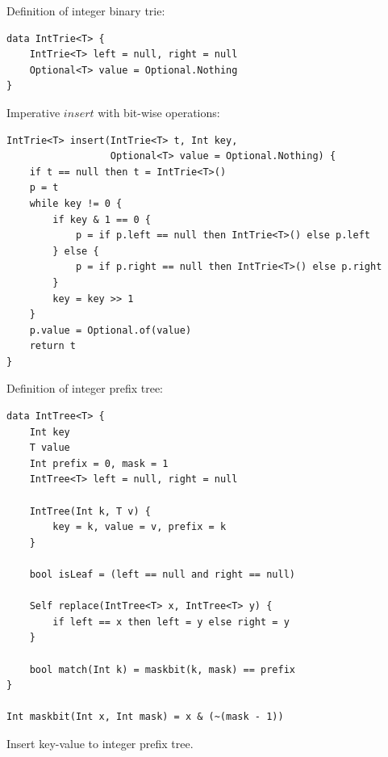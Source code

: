 \documentclass[b5paper]{article}
\begin{document}
Definition of integer binary trie:

\begin{lstlisting}[language = Bourbaki]
data IntTrie<T> {
    IntTrie<T> left = null, right = null
    Optional<T> value = Optional.Nothing
}
\end{lstlisting}

Imperative $insert$ with bit-wise operations:

\begin{lstlisting}[language = Bourbaki]
IntTrie<T> insert(IntTrie<T> t, Int key,
                  Optional<T> value = Optional.Nothing) {
    if t == null then t = IntTrie<T>()
    p = t
    while key != 0 {
        if key & 1 == 0 {
            p = if p.left == null then IntTrie<T>() else p.left
        } else {
            p = if p.right == null then IntTrie<T>() else p.right
        }
        key = key >> 1
    }
    p.value = Optional.of(value)
    return t
}
\end{lstlisting}



Definition of integer prefix tree:

\begin{lstlisting}[language = Bourbaki]
data IntTree<T> {
    Int key
    T value
    Int prefix = 0, mask = 1
    IntTree<T> left = null, right = null

    IntTree(Int k, T v) {
        key = k, value = v, prefix = k
    }

    bool isLeaf = (left == null and right == null)

    Self replace(IntTree<T> x, IntTree<T> y) {
        if left == x then left = y else right = y
    }

    bool match(Int k) = maskbit(k, mask) == prefix
}

Int maskbit(Int x, Int mask) = x & (~(mask - 1))
\end{lstlisting}

Insert key-value to integer prefix tree.
\end{document}
